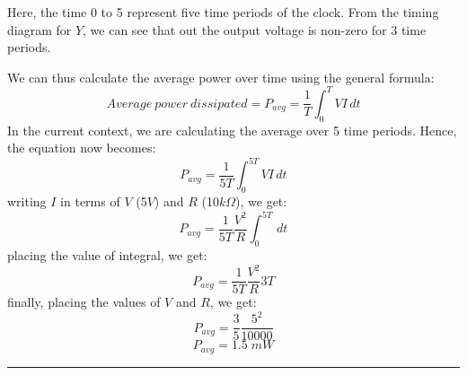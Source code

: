 \documentclass[table,xcdraw]{article}
\begin{document}
Here, the time 0 to 5 represent five time periods of the clock. 
From the timing diagram for $Y$, we can see that out the output voltage is non-zero for 3 time periods.\par
 We can thus calculate the average power over time using the general formula:
\begin{equation}
    Average\:power\:dissipated = P_{avg}=\frac{1}{T}\int_{0}^{T} VI \,dt
\end{equation}
    In the current context, we are calculating the average over 5 time periods. Hence, the equation now becomes:
\begin{equation} 
    P_{avg}=\frac{1}{5T}\int_{0}^{5T} VI \,dt
\end{equation}
    writing $I$ in terms of $V$ (5$V$) and $R$ (10$k\Omega$), we get:
\begin{equation}
    P_{avg}=\frac{1}{5T}\frac{V^2}{R}\int_{0}^{5T}\,dt
\end{equation}
placing the value of integral, we get:
\begin{equation}
    P_{avg}=\frac{1}{5T}\frac{V^2}{R}3T
\end{equation}
finally, placing the values of $V$ and $R$, we get:
\begin{equation}
    P_{avg}=\frac{3}{5}\frac{5^2}{10000}
\end{equation}
\begin{equation}
\boxed{
    P_{avg}=1.5\;mW }
\end{equation}
\vfill
\hrule
\end{document}
